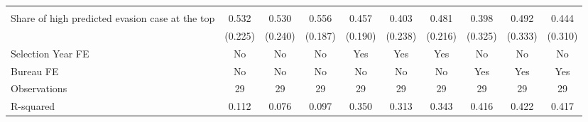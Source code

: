\begin{tabular}{l*{9}{c}}
\addlinespace \midrule \multicolumn{10}{l}{\textbf{Panel B: Continuous measure}}\\ \addlinespace

Share of high predicted evasion case at the top&       0.532\sym{**} &       0.530\sym{**} &       0.556\sym{***}&       0.457\sym{**} &       0.403         &       0.481\sym{**} &       0.398         &       0.492         &       0.444         \\
            &     (0.225)         &     (0.240)         &     (0.187)         &     (0.190)         &     (0.238)         &     (0.216)         &     (0.325)         &     (0.333)         &     (0.310)         \\
\midrule
Selection Year FE&          No         &          No         &          No         &         Yes         &         Yes         &         Yes         &          No         &          No         &          No         \\
Bureau FE   &          No         &          No         &          No         &          No         &          No         &          No         &         Yes         &         Yes         &         Yes         \\
Observations&          29         &          29         &          29         &          29         &          29         &          29         &          29         &          29         &          29         \\
R-squared   &       0.112         &       0.076         &       0.097         &       0.350         &       0.313         &       0.343         &       0.416         &       0.422         &       0.417         \\
\bottomrule \end{tabular}
